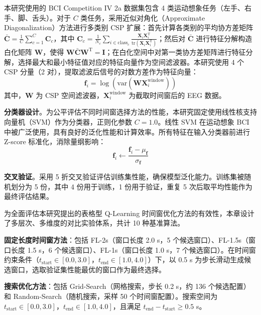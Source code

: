 本研究使用的 BCI Competition IV 2a 数据集包含 4 类运动想象任务（左手、右手、脚、舌头）。对于 $C$ 类任务，采用近似对角化（Approximate Diagonalization）方法进行多类别 CSP 扩展\cite{blankertz2008optimizing}：首先计算各类别的平均协方差矩阵 $\bar{\mathbf{C}} = \frac{1}{C}\sum_{c=1}^{C} \mathbf{C}_c$，其中 $\mathbf{C}_c = \frac{1}{N_c}\sum_{i \in \text{class}_c} \frac{\mathbf{X}_i \mathbf{X}_i^{\text{T}}}{\text{tr}(\mathbf{X}_i \mathbf{X}_i^{\text{T}})}$；然后对 $\bar{\mathbf{C}}$ 进行特征分解构造白化矩阵 $\mathbf{W}$，使得 $\mathbf{W} \bar{\mathbf{C}} \mathbf{W}^{\text{T}} = \mathbf{I}$；在白化空间中对第一类协方差矩阵进行特征分解，选择最大和最小特征值对应的特征向量作为空间滤波器。本研究使用 4 个 CSP 分量（2 对），提取滤波后信号的对数方差作为特征向量：
\begin{equation}
\mathbf{f}_i = \log \left( \text{var}(\mathbf{W} \mathbf{X}_i^{\text{window}}) \right)
\end{equation}
其中，$\mathbf{W}$ 为 CSP 空间滤波器，$\mathbf{X}_i^{\text{window}}$ 为截取时间窗后的 EEG 数据。

\textbf{分类器设计}。为公平评估不同时间窗选择方法的性能，本研究固定使用线性核支持向量机（SVM）作为分类器，正则化参数 $C = 1.0$\cite{lotte2007review, pedregosa2011scikit}。线性 SVM 在运动想象 BCI 中被广泛使用，具有良好的泛化性能和计算效率。所有特征在输入分类器前进行 Z-score 标准化，消除量纲影响：
\begin{equation}
\mathbf{f}_i \leftarrow \frac{\mathbf{f}_i - \mu_{\mathbf{f}}}{\sigma_{\mathbf{f}}}
\end{equation}

\textbf{交叉验证}。采用 5 折交叉验证评估训练集性能，确保模型泛化能力\cite{lotte2007review}。训练集被随机划分为 5 份，其中 4 份用于训练，1 份用于验证，重复 5 次后取平均性能作为最终评估结果。

\label{subsec:baseline_methods}

为全面评估本研究提出的表格型 Q-Learning 时间窗优化方法的有效性，本章设计了多层次、多维度的对比实验体系，共计 10 种基准算法。

\textbf{固定长度时间窗方法}：包括 FL-2s（窗口长度 2.0 s，5 个候选窗口）、FL-1.5s（窗口长度 1.5 s，6 个候选窗口）、FL-1s（窗口长度 1.0 s，7 个候选窗口）。在时间窗约束条件（$t_{\text{start}} \in [0.0, 3.0]$，$t_{\text{end}} \in [1.0, 4.0]$）下，以 0.5 s 为步长滑动生成候选窗口，选取验证集性能最优的窗口作为最终选择。

\textbf{搜索优化方法}：包括 Grid-Search（网格搜索，步长 0.2 s，约 136 个候选配置）和 Random-Search（随机搜索，采样 50 个时间窗配置）。搜索空间为 $t_{\text{start}} \in [0.0, 3.0]$，$t_{\text{end}} \in [1.0, 4.0]$，且满足 $t_{\text{end}} - t_{\text{start}} \geq 0.5$ s。

